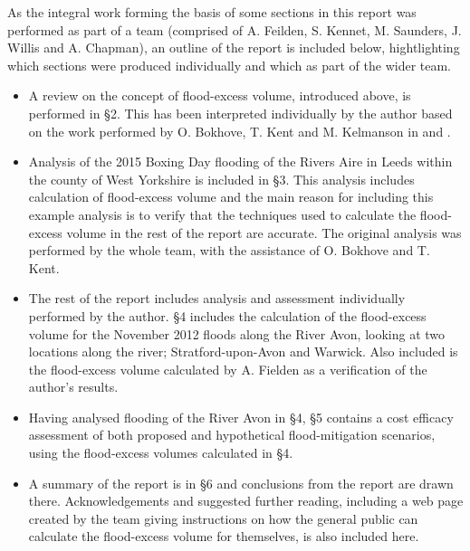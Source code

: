 \documentclass[11pt,a4paper]{article}
\begin{document}
As the integral work forming the basis of some sections in this report was performed as part of a team (comprised of A. Feilden, S. Kennet, M. Saunders, J. Willis and A. Chapman), an outline of the report is included below, hightlighting which sections were produced individually and which as part of the wider team.
\begin{framed}
\begin{itemize}
\item A review on the concept of flood-excess volume, introduced above, is performed in \S 2. This has been interpreted individually by the author based on the work performed by O. Bokhove, T. Kent and M. Kelmanson in \cite{Aire} and \cite{Calder-Don}.
\item Analysis of the 2015 Boxing Day flooding of the Rivers Aire in Leeds within the county of West Yorkshire is included in \S 3. This analysis includes calculation of flood-excess volume and the main reason for including this example analysis is to verify that the techniques used to calculate the flood-excess volume in the rest of the report are accurate. The original analysis was performed by the whole team, with the assistance of O. Bokhove and T. Kent.
\item The rest of the report includes analysis and assessment individually performed by the author. \S 4 includes the calculation of the flood-excess volume for the November 2012 floods along the River Avon, looking at two locations along the river{;} Stratford-upon-Avon and Warwick. Also included is the flood-excess volume calculated by A. Fielden as a verification of the author's results.
\item Having analysed flooding of the River Avon in \S 4, \S 5 contains a cost efficacy assessment of both proposed and hypothetical flood-mitigation scenarios, using the flood-excess volumes calculated in \S 4.
\item A summary of the report is in \S 6 and conclusions from the report are drawn there. Acknowledgements and suggested further reading, including a web page created by the team giving instructions on how the general public can calculate the flood-excess volume for themselves, is also included here.
\end{itemize}
\end{framed}
\end{document}
